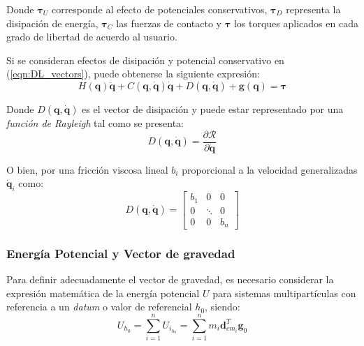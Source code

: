     Donde $\boldsymbol{\tau}_U$ corresponde al efecto de potenciales conservativos, $\boldsymbol{\tau}_D$ representa la disipación de energía, $\boldsymbol{\tau}_C$
    las fuerzas de contacto y $\boldsymbol{\tau}$ los torques aplicados en cada grado de libertad de acuerdo al usuario. 
    
    Si se consideran efectos de disipación y potencial conservativo en (\ref{eqn:DL_vectors}), puede obtenerse la siguiente expresión:
    \begin{equation}
        \label{eqn:DL_final}
        H(\boldsymbol{q}) \boldsymbol{\ddot{q}} + C(\boldsymbol{q}, \boldsymbol{\dot{q}}) \boldsymbol{\dot{q}} + D(\boldsymbol{q}, \boldsymbol{\dot{q}})
        + \boldsymbol{g}(\boldsymbol{q}) = \boldsymbol{\tau}
    \end{equation}
    
    Donde $D(\boldsymbol{q}, \boldsymbol{\dot{q}})$ es el vector de disipación y puede estar representado por una \emph{función de Rayleigh} tal como se presenta:
    \begin{equation}
        \label{eqn:disipacion_ray}
        D(\boldsymbol{q}, \boldsymbol{\dot{q}}) = \frac{\partial \mathcal{R}}{\partial \boldsymbol{\dot{q}}}
    \end{equation} 

    O bien, por una fricción viscosa lineal $b_i$ proporcional a la velocidad generalizadas $\boldsymbol{\dot{q}}_i$ como:
    \begin{equation}
        \label{eqn:disipacion_simple}
        D(\boldsymbol{q}, \boldsymbol{\dot{q}}) = \begin{bmatrix} b_1 & 0 & 0 \\ 0 & \ddots & 0 \\ 0 & 0 & b_n  \end{bmatrix} 
    \end{equation}

    \subsubsection{Energía Potencial y Vector de gravedad}
    \noindent Para definir adecuadamente el vector de gravedad, es necesario considerar la expresión matemática de la energía potencial $U$ para sistemas multipartículas con
    referencia a un \emph{datum} o valor de referencial $h_0$, siendo:
    \begin{equation}
        \label{eqn:energia_potencial}
         U_{h_0} = \sum_{i=1}^n U_{i_{h_0}} =  \sum_{i=1}^n m_i \boldsymbol{d}_{cm_i}^T \boldsymbol{g}_0
    \end{equation}

